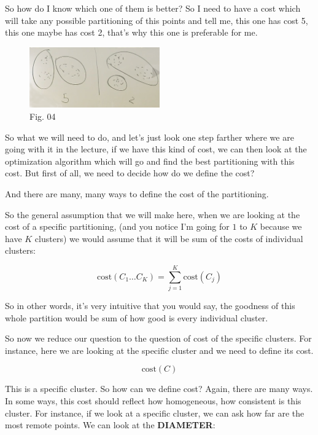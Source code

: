 \documentclass[a4paper, 12pt]{article}
\begin{document}
So how do I know which one of them is better? So I need to have a cost which
will take any possible partitioning of this points and tell me, this one has
cost 5, this one maybe has cost 2, that's why this one is preferable for me.

\begin{figure}[H]
\centering
\includegraphics[width=0.5\textwidth]{./pic/04-06-fig-04.png}
\caption{\label{fig:orge084be1}Fig. 04}
\end{figure}

So what we will need to do, and let's just look one step farther where we are
going with it in the lecture, if we have this kind of cost, we can then look at
the optimization algorithm which will go and find the best partitioning with
this cost. But first of all, we need to decide how do we define the cost?

And there are many, many ways to define the cost of the partitioning.

So the general assumption that we will make here, when we are looking at the
cost of a specific partitioning, (and you notice I'm going for \(1\) to \(K\)
because we have \(K\) clusters) we would assume that it will be sum of the costs
of individual clusters:

\begin{equation}
\text{cost}(C_1 \ldots C_K) = \sum_{j=1}^{K}\text{cost}(C_j)
\end{equation}

So in other words, it's very intuitive that you would say, the goodness of this
whole partition would be sum of how good is every individual cluster.

So now we reduce our question to the question of cost of the specific clusters.
For instance, here we are looking at the specific cluster and we need to define
its cost.

\begin{equation}
\text{cost}(C)
\end{equation}

This is a specific cluster. So how can we define cost? Again, there are many
ways. In some ways, this cost should reflect how homogeneous, how consistent is
this cluster. For instance, if we look at a specific cluster, we can ask how far
are the most remote points. We can look at the \textbf{DIAMETER}:
\end{document}

